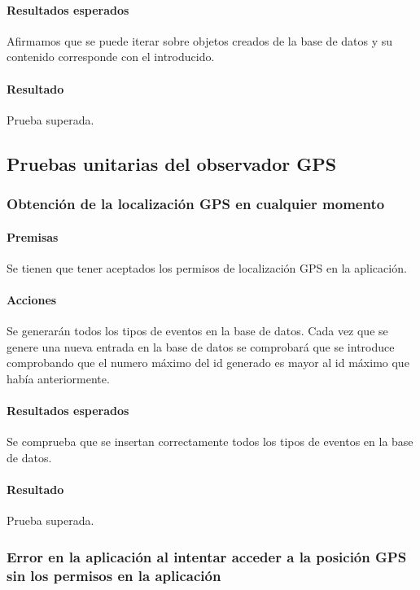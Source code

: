 \paragraph{Resultados esperados}

Afirmamos que se puede iterar sobre objetos creados de la base de datos y su contenido corresponde con el introducido.

\paragraph{Resultado}
Prueba superada.

\subsection{Pruebas unitarias del observador GPS}

\subsubsection{Obtención de la localización GPS en cualquier momento}

\paragraph{Premisas}
Se tienen que tener aceptados los permisos de localización GPS en la aplicación.


\paragraph{Acciones}
Se generarán todos los tipos de eventos en la base de datos.
Cada vez que se genere una nueva entrada en la base de datos se comprobará que se introduce comprobando que el numero máximo del id generado es mayor al id máximo que había anteriormente.

\paragraph{Resultados esperados}

Se comprueba que se insertan correctamente todos los tipos de eventos en la base de datos.

\paragraph{Resultado}
Prueba superada.


\subsubsection{Error en la aplicación al intentar acceder a la posición GPS sin los permisos en la aplicación}


